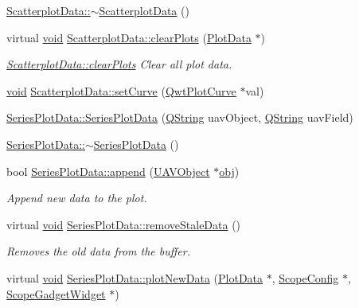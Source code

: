 \begin{DoxyCompactItemize}
\item 
\hyperlink{group___scope_plugin_gacbf85488507f5abc08a2e018fe01c6aa}{Scatterplot\-Data\-::$\sim$\-Scatterplot\-Data} ()
\item 
virtual \hyperlink{group___u_a_v_objects_plugin_ga444cf2ff3f0ecbe028adce838d373f5c}{void} \hyperlink{group___scope_plugin_gaa7f91ef4cdbbbdc7e767c24bfea06159}{Scatterplot\-Data\-::clear\-Plots} (\hyperlink{class_plot_data}{Plot\-Data} $\ast$)
\begin{DoxyCompactList}\small\item\em \hyperlink{group___scope_plugin_gaa7f91ef4cdbbbdc7e767c24bfea06159}{Scatterplot\-Data\-::clear\-Plots} Clear all plot data. \end{DoxyCompactList}\item 
\hyperlink{group___u_a_v_objects_plugin_ga444cf2ff3f0ecbe028adce838d373f5c}{void} \hyperlink{group___scope_plugin_gac306ab453dd4daa43ebd0565b7f73783}{Scatterplot\-Data\-::set\-Curve} (\hyperlink{class_qwt_plot_curve}{Qwt\-Plot\-Curve} $\ast$val)
\item 
\hyperlink{group___scope_plugin_ga82d1767158aa15b3c4306bc74960692e}{Series\-Plot\-Data\-::\-Series\-Plot\-Data} (\hyperlink{group___u_a_v_objects_plugin_gab9d252f49c333c94a72f97ce3105a32d}{Q\-String} uav\-Object, \hyperlink{group___u_a_v_objects_plugin_gab9d252f49c333c94a72f97ce3105a32d}{Q\-String} uav\-Field)
\item 
\hyperlink{group___scope_plugin_gae281a484eece3ddc571d397e576bad97}{Series\-Plot\-Data\-::$\sim$\-Series\-Plot\-Data} ()
\item 
bool \hyperlink{group___scope_plugin_ga3f88889724489ec42f8bc0544a3f4474}{Series\-Plot\-Data\-::append} (\hyperlink{class_u_a_v_object}{U\-A\-V\-Object} $\ast$\hyperlink{glext_8h_a0c0d4701a6c89f4f7f0640715d27ab26}{obj})
\begin{DoxyCompactList}\small\item\em Append new data to the plot. \end{DoxyCompactList}\item 
virtual \hyperlink{group___u_a_v_objects_plugin_ga444cf2ff3f0ecbe028adce838d373f5c}{void} \hyperlink{group___scope_plugin_gad07a97346395d3ee7ee2d455a6d863d1}{Series\-Plot\-Data\-::remove\-Stale\-Data} ()
\begin{DoxyCompactList}\small\item\em Removes the old data from the buffer. \end{DoxyCompactList}\item 
virtual \hyperlink{group___u_a_v_objects_plugin_ga444cf2ff3f0ecbe028adce838d373f5c}{void} \hyperlink{group___scope_plugin_ga9a0a0e2cd48eeba6f77d3da8421729c4}{Series\-Plot\-Data\-::plot\-New\-Data} (\hyperlink{class_plot_data}{Plot\-Data} $\ast$, \hyperlink{class_scope_config}{Scope\-Config} $\ast$, \hyperlink{class_scope_gadget_widget}{Scope\-Gadget\-Widget} $\ast$)

\end{DoxyCompactItemize}

